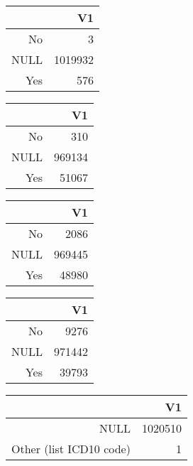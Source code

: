 \bigskip\bigskip
\centering
\begin{tabular}{rr}
  \hline
 & V1 \\ 
  \hline
No &   3 \\ 
  NULL & 1019932 \\ 
  Yes & 576 \\ 
   \hline
\end{tabular}

\bigskip\bigskip
\centering
\begin{tabular}{rr}
  \hline
 & V1 \\ 
  \hline
No & 310 \\ 
  NULL & 969134 \\ 
  Yes & 51067 \\ 
   \hline
\end{tabular}

\bigskip\bigskip
\centering
\begin{tabular}{rr}
  \hline
 & V1 \\ 
  \hline
No & 2086 \\ 
  NULL & 969445 \\ 
  Yes & 48980 \\ 
   \hline
\end{tabular}

\bigskip\bigskip
\centering
\begin{tabular}{rr}
  \hline
 & V1 \\ 
  \hline
No & 9276 \\ 
  NULL & 971442 \\ 
  Yes & 39793 \\ 
   \hline
\end{tabular}

\bigskip\bigskip
\centering
\begin{tabular}{rr}
  \hline
 & V1 \\ 
  \hline
NULL & 1020510 \\ 
  Other (list ICD10 code) &   1 \\ 
   \hline
\end{tabular}

